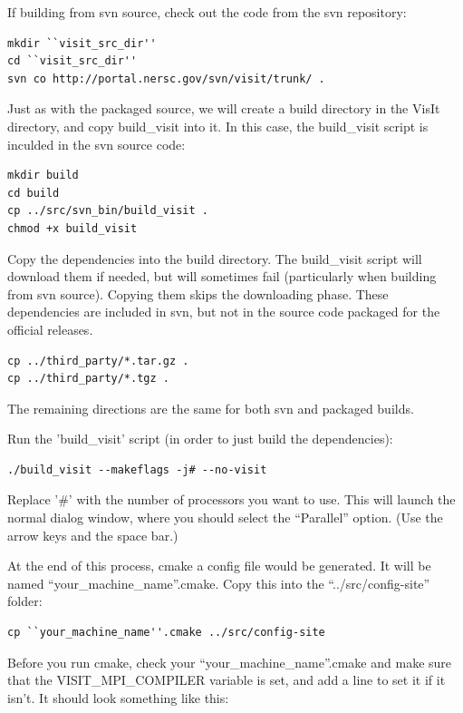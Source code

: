 \documentclass[12pt]{article}
\begin{document}
If building from svn source, check out the code from the svn repository:

\begin{verbatim}
mkdir ``visit_src_dir''
cd ``visit_src_dir'' 
svn co http://portal.nersc.gov/svn/visit/trunk/ .
\end{verbatim}

Just as with the packaged source, we will create a build directory in 
the VisIt directory, and copy build\_visit into it.  In this case,
the build\_visit script is inculded in the svn source code:

\begin{verbatim}
mkdir build
cd build
cp ../src/svn_bin/build_visit .
chmod +x build_visit
\end{verbatim}

Copy the dependencies into the build directory. The build\_visit script
will download them if needed, but will sometimes fail (particularly when
building from svn source).  Copying them
skips the downloading phase.  These dependencies are included in svn, but
not in the source code packaged for the official releases.

\begin{verbatim}
cp ../third_party/*.tar.gz .
cp ../third_party/*.tgz .
\end{verbatim}

The remaining directions are the same for both svn and packaged builds.

Run the 'build\_visit' script (in order to just build the dependencies):

\begin{verbatim}
./build_visit --makeflags -j# --no-visit
\end{verbatim}

Replace '\#' with the number of processors you want to use.  This
will launch the normal dialog window, where you should select
the ``Parallel'' option.  (Use the arrow keys and the space bar.)

At the end of this process, cmake a config file would be generated. It will
be named ``your\_machine\_name''.cmake. Copy this into the
``../src/config-site'' folder:

\begin{verbatim}
cp ``your_machine_name''.cmake ../src/config-site
\end{verbatim}


Before you run cmake, check your ``your\_machine\_name''.cmake
and make sure that the VISIT\_MPI\_COMPILER variable is set, and add
a line to set it if it isn't.  It should look something like this:
\end{document}
